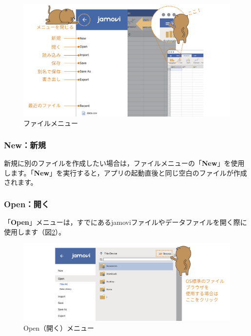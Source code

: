 \documentclass[
  12pt,
  a5jpaper,
  lualatex, ja=standard]{bxjsbook}
\begin{document}
\begin{figure}[!ht]

{\centering \includegraphics[width=1\linewidth]{images/intro/file} 

}

\caption{ファイルメニュー}\label{fig:file-menu}
\end{figure}

\hypertarget{subsec:intro-file-new}{%
\subsubsection*{New：新規}\label{subsec:intro-file-new}}

新規に別のファイルを作成したい場合は，ファイルメニューの「\textbf{New}」を使用します。「\textbf{New}」を実行すると，アプリの起動直後と同じ空白のファイルが作成されます。

\hypertarget{subsec:intro-file-open}{%
\subsubsection*{Open：開く}\label{subsec:intro-file-open}}

「\textbf{Open}」メニューは，すでにあるjamoviファイルやデータファイルを開く際に使用します（図\ref{fig:file-open}）。

\begin{figure}[!ht]

{\centering \includegraphics[width=1\linewidth]{images/intro/file-open} 

}

\caption{Open（開く）メニュー}\label{fig:file-open}
\end{figure}
\end{document}
